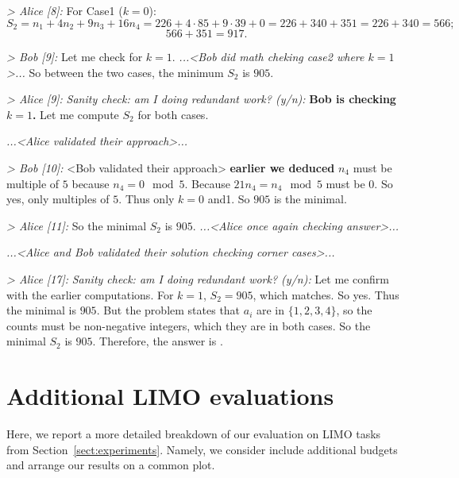 
\textit{> Alice [8]:}  For Case1 ($k=0$):
$$S_2 = n_1 +4n_2 +9n_3 +16n_4 =226 +4\cdot 85 +9\cdot 39 +0 =226 +340 +351= 226+340=566;$$
$$ 566+351=917.$$

\textit{> Bob [9]:}  Let me check for $k=1$. \textit{...<Bob did math cheking case2 where $k=1$>...}
So between the two cases, the minimum $S_2$ is $905$. 

\textit{> Alice [9]:} \textit{Sanity check: am I doing redundant work? (y/n):} \textbf{Bob is checking $k=1$.} Let me compute $S_2$ for both cases. 

\textit{...<Alice validated their approach>...}

\textit{> Bob [10]:} <Bob validated their approach> \textbf{earlier we deduced} $n_4$ must be multiple of $5$ because $n_4 =0 \mod5$. Because $21n_4 =n_4 \mod5$ must be $0$. So yes, only multiples of $5$. Thus only $k=0$ and1. So $905$ is the minimal. 

\textit{> Alice [11]:}  So the minimal $S_2$ is $905$. \textit{...<Alice once again checking answer>...}

\textit{...<Alice and Bob validated their solution checking corner cases>...}

\textit{> Alice [17]:} \textit{Sanity check: am I doing redundant work? (y/n):} Let me confirm with the earlier computations. For $k=1$, $S_2=905$, which matches. So yes. Thus the minimal is $905$. But the problem states that $a_i$ are in $\{1,2,3,4\}$, so the counts must be non-negative integers, which they are in both cases. So the minimal $S_2$ is $905$. Therefore, the answer is .


\section{Additional LIMO evaluations}\label{sect:appendix_extra_plots}

Here, we report a more detailed breakdown of our evaluation on LIMO tasks from Section~\ref{sect:experiments}. Namely, we consider include additional budgets and arrange our results on a common plot.

